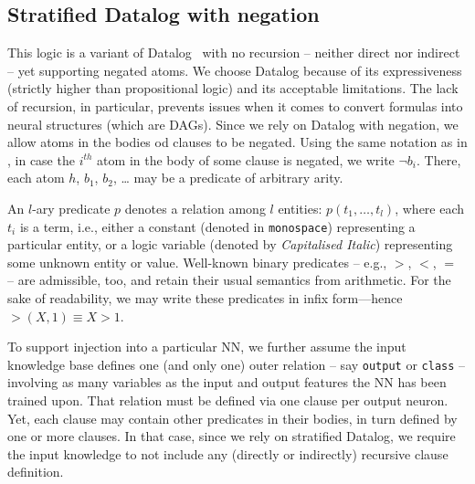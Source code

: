 \subsection{Stratified Datalog with negation}\label{subsec:ski-stratified-datalog-with-negation}
%
This logic is a variant of Datalog~\cite{DBLP:books/mc/18/MaierTKW18} with no recursion -- neither direct nor indirect -- yet supporting negated atoms.
%
We choose Datalog because of its expressiveness (strictly higher than propositional logic) and its acceptable limitations.
%
The lack of recursion, in particular, prevents issues when it comes to convert formulas into neural structures (which are \glspl{DAG}).
%
Since we rely on Datalog with negation, we allow atoms in the bodies od clauses to be negated.
%
Using the same notation as in , in case the $i^{th}$ atom in the body of some clause is negated, we write $\neg b_{i}$.
%
There, each atom $h$, $b_{1}$, $b_{2}$, \dots{} may be a predicate of arbitrary arity.

An \(l\)-ary predicate \(p\) denotes a relation among \(l\) entities: \(p(t_1, \dots, t_l)\), where each \(t_i\) is a term, i.e., either a constant (denoted in \texttt{monospace}) representing a particular entity, or a logic variable (denoted by \textit{Capitalised Italic}) representing some unknown entity or value.
%
Well-known binary predicates – e.g., \(>\), \(<\), \(=\) – are admissible, too, and retain their usual semantics from arithmetic.
%
For the sake of readability, we may write these predicates in infix form—hence \(>(X, 1) \equiv X > 1\).

To support injection into a particular \gls{NN}, we further assume the input knowledge base defines one (and only one) outer relation -- say \texttt{output} or \texttt{class} -- involving as many variables as the input and output features the \gls{NN} has been trained upon.
%
That relation must be defined via one clause per output neuron.
%
Yet, each clause may contain other predicates in their bodies, in turn defined by one or more clauses.
%
In that case, since we rely on stratified Datalog, we require the input knowledge to not include any (directly or indirectly) recursive clause definition.

